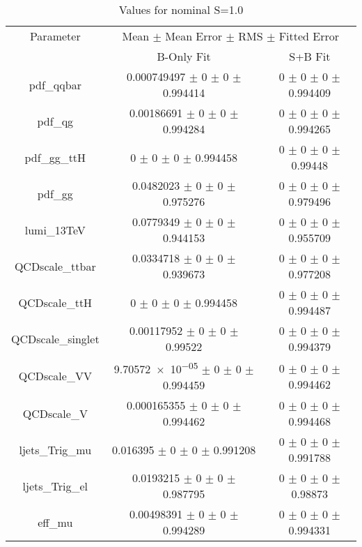 \begin{table}
\centering
\caption{Values for nominal S=1.0}
\begin{tabular}{ccc}
\toprule
Parameter 	& \multicolumn{2}{c}{Mean $\pm$ Mean Error $\pm$ RMS $\pm$ Fitted Error}\\
 	& B-Only Fit & S+B Fit\\
\midrule
pdf\_qqbar 	& \num{0.000749497} $\pm$ \num{0} $\pm$ \num{0} $\pm$ \num{0.994414} 	& \num{0} $\pm$ \num{0} $\pm$ \num{0} $\pm$ \num{0.994409}\\
pdf\_qg 	& \num{0.00186691} $\pm$ \num{0} $\pm$ \num{0} $\pm$ \num{0.994284} 	& \num{0} $\pm$ \num{0} $\pm$ \num{0} $\pm$ \num{0.994265}\\
pdf\_gg\_ttH 	& \num{0} $\pm$ \num{0} $\pm$ \num{0} $\pm$ \num{0.994458} 	& \num{0} $\pm$ \num{0} $\pm$ \num{0} $\pm$ \num{0.99448}\\
pdf\_gg 	& \num{0.0482023} $\pm$ \num{0} $\pm$ \num{0} $\pm$ \num{0.975276} 	& \num{0} $\pm$ \num{0} $\pm$ \num{0} $\pm$ \num{0.979496}\\
lumi\_13TeV 	& \num{0.0779349} $\pm$ \num{0} $\pm$ \num{0} $\pm$ \num{0.944153} 	& \num{0} $\pm$ \num{0} $\pm$ \num{0} $\pm$ \num{0.955709}\\
QCDscale\_ttbar 	& \num{0.0334718} $\pm$ \num{0} $\pm$ \num{0} $\pm$ \num{0.939673} 	& \num{0} $\pm$ \num{0} $\pm$ \num{0} $\pm$ \num{0.977208}\\
QCDscale\_ttH 	& \num{0} $\pm$ \num{0} $\pm$ \num{0} $\pm$ \num{0.994458} 	& \num{0} $\pm$ \num{0} $\pm$ \num{0} $\pm$ \num{0.994487}\\
QCDscale\_singlet 	& \num{0.00117952} $\pm$ \num{0} $\pm$ \num{0} $\pm$ \num{0.99522} 	& \num{0} $\pm$ \num{0} $\pm$ \num{0} $\pm$ \num{0.994379}\\
QCDscale\_VV 	& \num{9.70572e-05} $\pm$ \num{0} $\pm$ \num{0} $\pm$ \num{0.994459} 	& \num{0} $\pm$ \num{0} $\pm$ \num{0} $\pm$ \num{0.994462}\\
QCDscale\_V 	& \num{0.000165355} $\pm$ \num{0} $\pm$ \num{0} $\pm$ \num{0.994462} 	& \num{0} $\pm$ \num{0} $\pm$ \num{0} $\pm$ \num{0.994468}\\
ljets\_Trig\_mu 	& \num{0.016395} $\pm$ \num{0} $\pm$ \num{0} $\pm$ \num{0.991208} 	& \num{0} $\pm$ \num{0} $\pm$ \num{0} $\pm$ \num{0.991788}\\
ljets\_Trig\_el 	& \num{0.0193215} $\pm$ \num{0} $\pm$ \num{0} $\pm$ \num{0.987795} 	& \num{0} $\pm$ \num{0} $\pm$ \num{0} $\pm$ \num{0.98873}\\
eff\_mu 	& \num{0.00498391} $\pm$ \num{0} $\pm$ \num{0} $\pm$ \num{0.994289} 	& \num{0} $\pm$ \num{0} $\pm$ \num{0} $\pm$ \num{0.994331}\\

\end{tabular}
\end{table}
